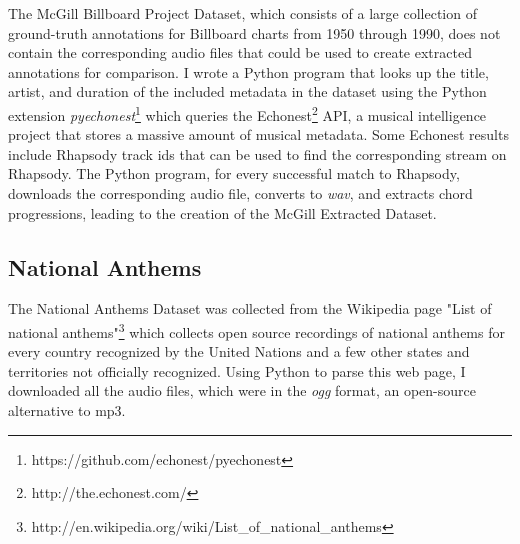 The McGill Billboard Project Dataset\cite{BurgoyneEtAl_2011_AnExpeGrouSet}, which consists of a large collection of ground-truth annotations for Billboard charts from 1950 through 1990, does not contain the corresponding audio files that could be used to create extracted annotations for comparison. I wrote a Python program that looks up the title, artist, and duration of the included metadata in the dataset using the Python extension \textit{pyechonest}\footnote{https://github.com/echonest/pyechonest} which queries the Echonest\footnote{http://the.echonest.com/} API, a musical intelligence project that stores a massive amount of musical metadata. Some Echonest results include Rhapsody track ids that can be used to find the corresponding stream on Rhapsody. The Python program, for every successful match to Rhapsody, downloads the corresponding audio file, converts to \textit{wav}, and extracts chord progressions, leading to the creation of the McGill Extracted Dataset.

\subsection{National Anthems}

The National Anthems Dataset was collected from the Wikipedia page "List of national anthems"\footnote{http://en.wikipedia.org/wiki/List_of_national_anthems} which collects open source recordings of national anthems for every country recognized by the United Nations and a few other states and territories not officially recognized. Using Python to parse this web page, I downloaded all the audio files, which were in the \textit{ogg} format, an open-source alternative to mp3.